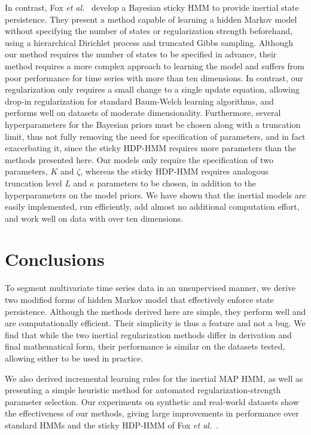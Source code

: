 \documentclass[letterpaper]{article}
\begin{document}
In contrast, Fox \emph{et al.}\ \cite{fox2011sticky} develop a Bayesian sticky HMM to provide inertial state persistence. They present a method capable of learning a hidden Markov model without specifying the number of states or regularization strength beforehand, using a hierarchical Dirichlet process and truncated Gibbs sampling. Although our method requires the number of states to be specified in advance, their method requires a more complex approach to learning the model and suffers from poor performance for time series with more than ten dimensions. In contrast, our regularization only requires a small change to a single update equation, allowing drop-in regularization for standard Baum-Welch learning algorithms, and performs well on datasets of moderate dimensionality. Furthermore, several hyperparameters for the Bayesian priors must be chosen along with a truncation limit, thus not fully removing the need for specification of parameters, and in fact exacerbating it, since the sticky HDP-HMM requires more parameters than the methods presented here. Our models only require the specification of two parameters, $K$ and $\zeta$, whereas the sticky HDP-HMM requires analogous truncation level $L$ and $\kappa$ parameters to be chosen, in addition to the hyperparameters on the model priors. We have shown that the inertial models are easily implemented, run efficiently, add almost no additional computation effort, and work well on data with over ten dimensions.

\section{Conclusions}

To segment multivariate time series data in an unsupervised manner, we derive two modified forms of hidden Markov model that effectively enforce state persistence. Although the methods derived here are simple, they perform well and are computationally efficient. Their simplicity is thus a feature and not a bug. We find that while the two inertial regularization methods differ in derivation and final mathematical form, their performance is similar on the datasets tested, allowing either to be used in practice. 

We also derived incremental learning rules for the inertial MAP HMM, as well as presenting a simple heuristic method for automated regularization-strength parameter selection. Our experiments on synthetic and real-world datasets show the effectiveness of our methods, giving large improvements in performance over standard HMMs and the sticky HDP-HMM of Fox \emph{et al.}~\cite{fox2011sticky}.
\end{document}
